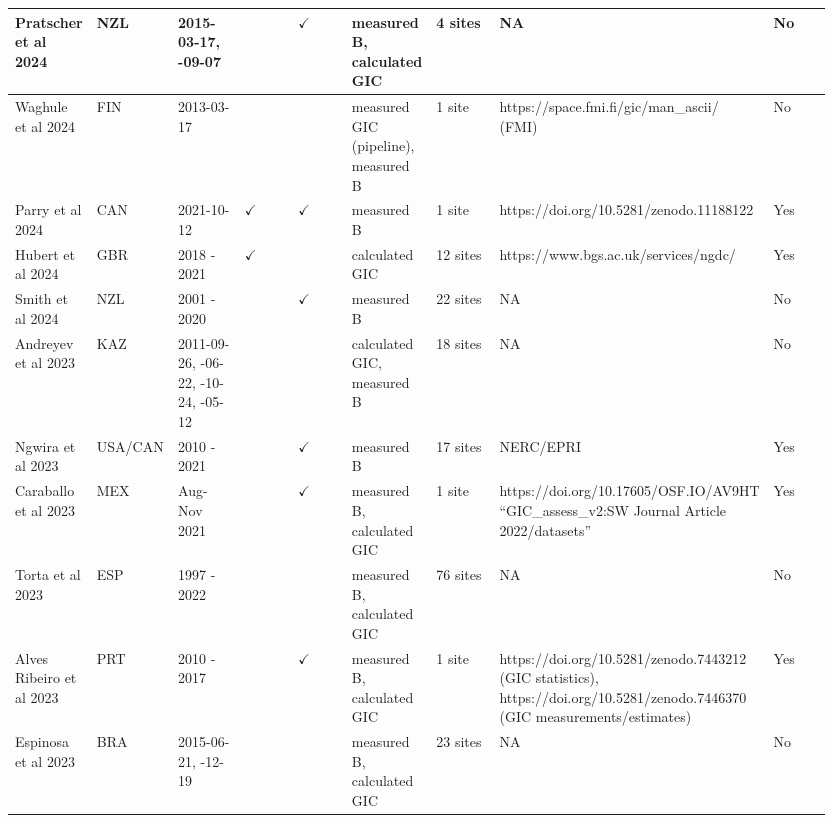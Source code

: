 \begin{longtable}{p{0.106\linewidth}p{0.106\linewidth}p{0.106\linewidth}p{0.106\linewidth}p{0.106\linewidth}p{0.106\linewidth}p{0.106\linewidth}p{0.106\linewidth}p{0.106\linewidth}}
Pratscher et al 2024 & NZL & 2015-03-17, \newline 2017-09-07 &  & $\checkmark$ & measured B, \newline calculated GIC & 4 sites & NA & No \\ \hline
Waghule et al 2024 & FIN & 2013-03-17 &  &  & measured GIC (pipeline), \newline measured B & 1 site & https://space.fmi.fi/gic/man\_ascii/ (FMI) & No \\ \hline
Parry et al 2024 & CAN & 2021-10-12 & $\checkmark$ & $\checkmark$ & measured B & 1 site & https://doi.org/10.5281/zenodo.11188122 & Yes \\ \hline
Hubert et al 2024 & GBR & 2018 - 2021 & $\checkmark$ &  & calculated GIC & 12 sites & https://www.bgs.ac.uk/services/ngdc/ & Yes \\ \hline
Smith et al 2024 & NZL & 2001 - 2020 &  & $\checkmark$ & measured B & 22 sites & NA & No \\ \hline
Andreyev et al 2023 & KAZ & 2011-09-26, \newline 2015-06-22, \newline 2016-10-24, \newline 2021-05-12 &  &  & calculated GIC, \newline measured B & 18 sites & NA & No \\ \hline
Ngwira et al 2023 & USA/CAN & 2010 - 2021 &  & $\checkmark$ & measured B & 17 sites & NERC/EPRI & Yes \\ \hline
Caraballo et al 2023 & MEX & Aug-Nov 2021 &  & $\checkmark$ & measured B, \newline calculated GIC & 1 site & https://doi.org/10.17605/OSF.IO/AV9HT “GIC\_assess\_v2:SW Journal Article 2022/datasets” & Yes \\ \hline
Torta et al 2023 & ESP & 1997 - 2022 &  &  & measured B, \newline calculated GIC & 76 sites & NA & No \\ \hline
Alves Ribeiro et al 2023 & PRT & 2010 - 2017 &  & $\checkmark$ & measured B, \newline calculated GIC & 1 site & https://doi.org/10.5281/zenodo.7443212 (GIC statistics), \newline https://doi.org/10.5281/zenodo.7446370 (GIC measurements/estimates) & Yes \\ \hline
Espinosa et al 2023 & BRA & 2015-06-21, \newline 2015-12-19 &  &  & measured B, \newline calculated GIC & 23 sites & NA & No \\ \hline

\end{longtable}
